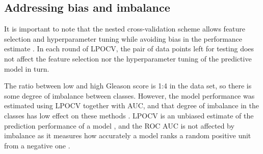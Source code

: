 \subsection{Addressing bias and imbalance}

It is important to note that the nested cross-validation scheme allows feature
selection and hyperparameter tuning while avoiding bias in the performance
estimate \citep{Varma2006}. In each round of LPOCV, the pair of data points left
for testing does not affect the feature selection nor the hyperparameter tuning
of the predictive model in turn.

The ratio between low and high Gleason score is 1:4 in the data set, so there is
some degree of imbalance between classes. However, the model performance was
estimated using LPOCV together with AUC, and that degree of imbalance in the
classes has low effect on these methods \citep{Airola2011, Smith2014}. LPOCV is
an unbiased estimate of the prediction performance of a model
\citep{Airola2011}, and the ROC AUC is not affected by imbalance as it measures
how accurately a model ranks a random positive unit from a negative one
\citep{Fawcett2006}.
